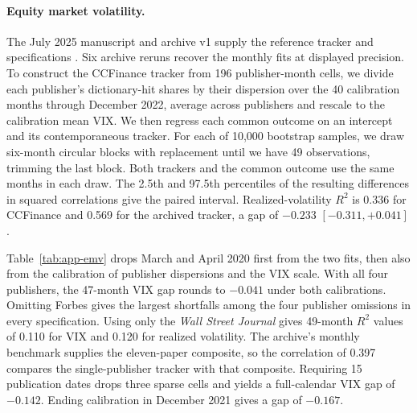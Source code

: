 \paragraph{Equity market volatility.}
The July 2025 manuscript and archive v1 supply the reference tracker
and specifications \citep{baker2025ms,baker2025archive}. Six archive
reruns recover the monthly fits at displayed precision. To construct
the CCFinance tracker from 196 publisher-month cells,
we divide each publisher's dictionary-hit shares by their dispersion
over the 40 calibration months through December 2022, average across
publishers and rescale to the calibration mean VIX. We then regress
each common outcome on an intercept and its contemporaneous tracker.
For each of 10,000 bootstrap samples, we draw six-month circular
blocks with replacement until we have 49 observations, trimming the
last block. Both trackers and the common outcome use the same months
in each draw. The 2.5th and 97.5th percentiles of the resulting
differences in squared correlations give the paired interval.
Realized-volatility $R^2$ is 0.336 for CCFinance and 0.569 for
the archived tracker, a gap of $-0.233$ $[-0.311,+0.041]$.

Table~\ref{tab:app-emv} drops March and April 2020 first from the two
fits, then also from the calibration of publisher dispersions and the
VIX scale. With all four publishers, the 47-month VIX gap rounds to
$-0.041$ under both calibrations. Omitting Forbes gives the largest
shortfalls among the four publisher omissions in every specification.
Using only the \emph{Wall Street Journal} gives 49-month $R^2$ values
of 0.110 for VIX and 0.120 for realized volatility. The archive's
monthly benchmark supplies the eleven-paper composite, so the
correlation of 0.397 compares the single-publisher tracker with that
composite. Requiring 15 publication dates drops three sparse cells and
yields a full-calendar VIX gap of $-0.142$. Ending calibration in
December 2021 gives a gap of $-0.167$.

